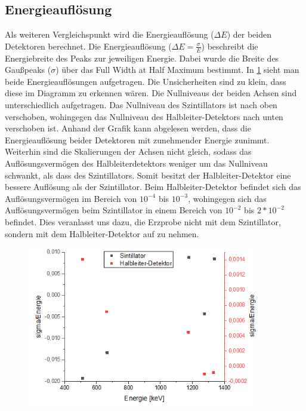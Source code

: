 \subsection{Energieauflösung}
Als weiteren Vergleichspunkt wird die Energieauflösung ($\Delta E$) der beiden Detektoren berechnet.
Die Energieauflösung ($\Delta E = \frac{\sigma}{E}$) beschreibt die Energiebreite des Peaks zur jeweiligen Energie. Dabei wurde die Breite des Gaußpeaks ($\sigma$) über das Full Width at Half Maximum bestimmt.
In \cref{sig} sieht man beide Energieauflösungen aufgetragen. Die Unsicherheiten sind zu klein, dass diese im Diagramm zu erkennen wären.
Die Nullniveaus der beiden Achsen sind unterschiedlich aufgetragen. Das Nullniveau des Szintillators ist nach oben verschoben, wohingegen das Nullniveau des Halbleiter-Detektors nach unten verschoben ist. Anhand der Grafik kann abgelesen werden, dass die Energieauflösung beider Detektoren mit zunehmender Energie zunimmt.
Weiterhin sind die Skalierungen der Achsen nicht gleich, sodass das Auflösungsvermögen des Halbleiterdetektors weniger um das Nullniveau schwankt, als dass des Szintillators. Somit besitzt der Halbleiter-Detektor eine bessere Auflösung als der Szintillator.
Beim Halbleiter-Detektor befindet sich das Auflösungsvermögen im Bereich von $10^{-4}$ bis $10^{-3}$, wohingegen sich das Auflösungsvermögen beim Szintillator in einem Bereich von $10^{-2}$ bis $2*10^{-2}$ befindet.
Dies veranlasst uns dazu, die Erzprobe nicht mit dem Szintillator, sondern mit dem Halbleiter-Detektor auf zu nehmen.
\begin{figure}[h!]
	\centering
	\includegraphics[width=0.9\textwidth]{sigma.png}
	\caption{}
	\label{sig}
\end{figure}

